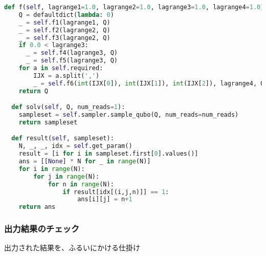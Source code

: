 \documentclass[uplatex,dvipdfmx,a4paper,11pt,oneside,openany]{jsbook}
\begin{document}
\begin{lstlisting}[language=Python]
  def f(self, lagrange1=1.0, lagrange2=1.0, lagrange3=1.0, lagrange4=1.0):
    Q = defaultdict(lambda: 0)
    _ = self.f1(lagrange1, Q)
    _ = self.f2(lagrange2, Q)
    _ = self.f3(lagrange2, Q)
    if 0.0 < lagrange3:
      _ = self.f4(lagrange3, Q)
      _ = self.f5(lagrange3, Q)
    for a in self.required:
        IJX = a.split(',')
        _ = self.f6(int(IJX[0]), int(IJX[1]), int(IJX[2]), lagrange4, Q)
    return Q

  def solv(self, Q, num_reads=1):
    sampleset = self.sampler.sample_qubo(Q, num_reads=num_reads)
    return sampleset

  def result(self, sampleset):
    N, _, _, idx = self.get_param()
    result = [i for i in sampleset.first[0].values()]
    ans = [[None] * N for _ in range(N)]
    for i in range(N):
        for j in range(N):
            for n in range(N):
                if result[idx[(i,j,n)]] == 1:
                    ans[i][j] = n+1
    return ans
\end{lstlisting}

\subsubsection{出力結果のチェック}

出力された結果を、ふるいにかける仕掛け
\end{document}
